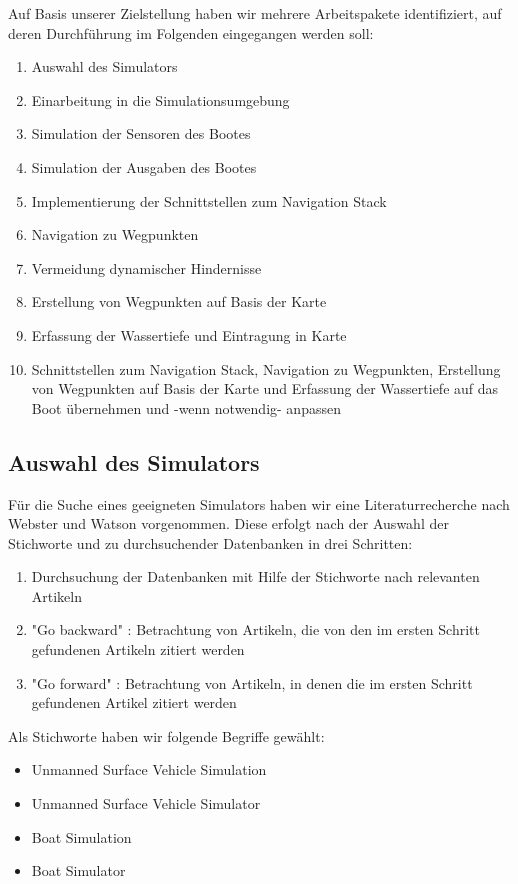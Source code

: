 \documentclass[conference]{IEEEtran}
\begin{document}
Auf Basis unserer Zielstellung haben wir mehrere Arbeitspakete identifiziert, auf deren Durchführung im Folgenden eingegangen werden soll:
\begin{enumerate}
	\item Auswahl des Simulators
	\item Einarbeitung in die Simulationsumgebung
	\item Simulation der Sensoren des Bootes
	\item Simulation der Ausgaben des Bootes
	\item Implementierung der Schnittstellen zum Navigation Stack
	\item Navigation zu Wegpunkten
	\item Vermeidung dynamischer Hindernisse
	\item Erstellung von Wegpunkten auf Basis der Karte
	\item Erfassung der Wassertiefe und Eintragung in Karte
	\item Schnittstellen zum Navigation Stack, Navigation zu Wegpunkten, Erstellung von Wegpunkten auf Basis der Karte und Erfassung der Wassertiefe auf das Boot übernehmen und -wenn notwendig- anpassen
\end{enumerate}

\subsection{Auswahl des Simulators}

Für die Suche eines geeigneten Simulators haben wir eine Literaturrecherche nach Webster und Watson \cite{webster2002} vorgenommen. Diese erfolgt nach der Auswahl der Stichworte und zu durchsuchender Datenbanken in drei Schritten:

\begin{enumerate}
	\item Durchsuchung der Datenbanken mit Hilfe der Stichworte nach relevanten Artikeln
	\item "Go backward" \cite{webster2002}: Betrachtung von Artikeln, die von den im ersten Schritt gefundenen Artikeln zitiert werden
	\item "Go forward" \cite{webster2002}: Betrachtung von Artikeln, in denen die im ersten Schritt gefundenen Artikel zitiert werden
\end{enumerate}

Als Stichworte haben wir folgende Begriffe gewählt:

\begin{itemize}
	\item Unmanned Surface Vehicle Simulation
	\item Unmanned Surface Vehicle Simulator
	\item Boat Simulation
	\item Boat Simulator
\end{itemize}
\end{document}

